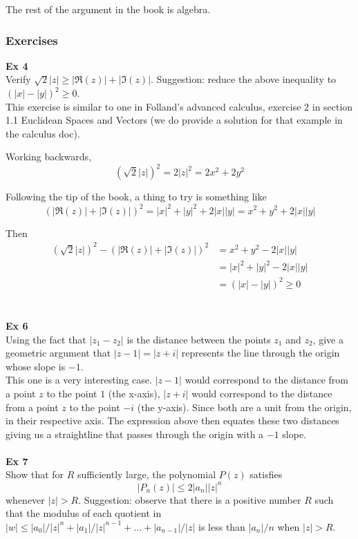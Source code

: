 The rest of the argument in the book is algebra.


\subsubsection{Exercises}

\textbf{Ex 4}
\\
Verify $\sqrt{2}|z| \geq |\Re(z)| + |\Im(z)|$.
Suggestion: reduce the above inequality to $(|x| - |y|)^2 \geq 0$.
\\

This exercise is similar to one in Folland's advanced calculus, exercise 2 in section 1.1 Euclidean Spaces and Vectors
(we do provide a solution for that example in the calculus doc).

Working backwards,
$$
(\sqrt{2} |z|)^2 = 2|z|^2 = 2x^2 + 2y^2
$$

Following the tip of the book, a thing to try is something like
$$
(|\Re(z)| + |\Im(z)|)^2 = |x|^2 + |y|^2 + 2|x||y| = x^2 + y^2 + 2|x||y|
$$

Then
\begin{align*}
(\sqrt{2} |z|)^2  -  (|\Re(z)| + |\Im(z)|)^2 &= x^2 + y^2 - 2|x||y| \\
&= |x|^2 + |y|^2 - 2|x||y| \\
&= (|x| - |y|)^2 \geq 0
\end{align*}
\\~\\


\textbf{Ex 6}
\\
Using the fact that $|z_1 - z_2|$ is the distance between the points $z_1$ and $z_2$,
give a geometric argument that $|z - 1| = |z + i|$ represents the line through the origin
whose slope is $-1$.
\\

This one is a very interesting case.
$|z-1|$ would correspond to the distance from a point $z$ to the point $1$ (the x-axis),
$|z+i|$ would correspond to the distance from a point $z$ to the point $-i$ (the y-axis).
Since both are a unit from the origin, in their respective axis.
The expression above then equates these two distances giving us a straightline that passes through
the origin with a $-1$ slope.
\\~\\


\textbf{Ex 7}
\\
Show that for $R$ sufficiently large, the polynomial $P(z)$ satisfies
$$
|P_n(z)| \leq 2 |a_n||z|^n
$$
whenever $|z| > R$.
Suggestion: observe that there is a positive number $R$ such that the modulus
of each quotient in $|w| \leq |a_0|/|z|^n + |a_1|/|z|^{n-1} + \ldots + |a_{n-1}|/|z|$
is less than $|a_n|/n$ when $|z| > R$.
\\

